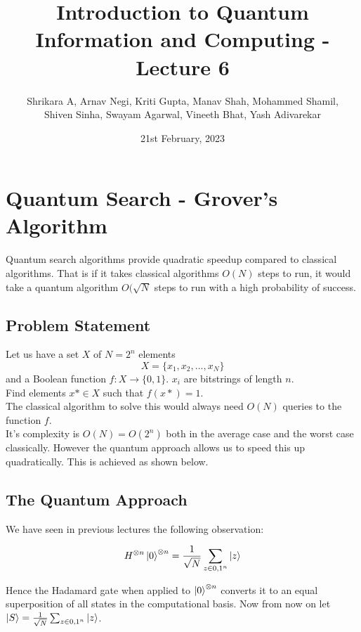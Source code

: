 \documentclass{article}
\title{Introduction to Quantum Information and Computing - Lecture 6}
\author{Shrikara A, Arnav Negi, Kriti Gupta, Manav Shah, Mohammed Shamil,\\ Shiven Sinha, Swayam Agarwal, Vineeth Bhat, Yash Adivarekar} %
\date{21st February, 2023}
\begin{document}
    \maketitle


    \section{Quantum Search - Grover's Algorithm}

    Quantum search algorithms provide quadratic speedup compared to classical algorithms. That is if 
    it takes classical algorithms $O(N)$ steps to run, it would take a quantum algorithm $O(\sqrt{N}$
    steps to run with a high probability of success.
    
        \subsection{Problem Statement}

            Let us have a set $X$ of $N=2^n$ elements 
            $$X = \{x_1, x_2, ... ,x_N\}$$
            and a Boolean function $f: X \rightarrow \{0, 1\}$. 
            $x_i$ are bitstrings of length $n$. \\
            Find elements $x* \in X$ such that $f(x*) = 1$. \\

            The classical algorithm to solve this would always need $O(N)$ queries to the function $f$.\\

            It's complexity is $O(N) = O(2^n)$ both in the average case and the worst case classically.
            However the quantum approach allows us to speed this up quadratically.
            This is achieved as shown below.
            
            
        \subsection{The Quantum Approach}
            We have seen in previous lectures the following observation:

            $$H^{\otimes n}\ket{0}^{\otimes n} = \frac{1}{\sqrt{N}}\sum_{z \in {0,1}^n}\ket{z}$$

            Hence the Hadamard gate when applied to $\ket{0}^{\otimes n}$ converts it to an equal superposition of all states in the computational basis. Now from now on let 
            $\ket{S} =\frac{1}{\sqrt{N}}\sum_{z \in {0,1}^n}\ket{z} $. \\
\end{document}
